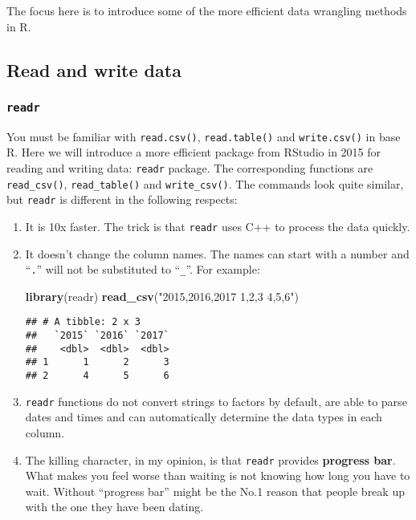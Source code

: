 \documentclass[
]{article}
\newenvironment{Shaded}{\begin{snugshade}}{\end{snugshade}}
\newcommand{\KeywordTok}[1]{\textcolor[rgb]{0.13,0.29,0.53}{\textbf{#1}}}
\newcommand{\NormalTok}[1]{#1}
\newcommand{\StringTok}[1]{\textcolor[rgb]{0.31,0.60,0.02}{#1}}
\begin{document}
The focus here is to introduce some of the more efficient data wrangling
methods in R.

\hypertarget{read-and-write-data}{%
\subsection{Read and write data}\label{read-and-write-data}}

\hypertarget{readr}{%
\subsubsection{\texorpdfstring{\texttt{readr}}{readr}}\label{readr}}

You must be familiar with \texttt{read.csv()}, \texttt{read.table()} and
\texttt{write.csv()} in base R. Here we will introduce a more efficient
package from RStudio in 2015 for reading and writing data:
\texttt{readr} package. The corresponding functions are
\texttt{read\_csv()}, \texttt{read\_table()} and \texttt{write\_csv()}.
The commands look quite similar, but \texttt{readr} is different in the
following respects:

\begin{enumerate}
\def\labelenumi{\arabic{enumi}.}
\item
  It is 10x faster. The trick is that \texttt{readr} uses C++ to process
  the data quickly.
\item
  It doesn't change the column names. The names can start with a number
  and ``\texttt{.}'' will not be substituted to ``\texttt{\_}''. For
  example:

\begin{Shaded}
\begin{Highlighting}[]
\KeywordTok{library}\NormalTok{(readr)}
\KeywordTok{read_csv}\NormalTok{(}\StringTok{"2015,2016,2017}
\StringTok{1,2,3}
\StringTok{4,5,6"}\NormalTok{)}
\end{Highlighting}
\end{Shaded}

\begin{verbatim}
## # A tibble: 2 x 3
##   `2015` `2016` `2017`
##    <dbl>  <dbl>  <dbl>
## 1      1      2      3
## 2      4      5      6
\end{verbatim}
\item
  \texttt{readr} functions do not convert strings to factors by default,
  are able to parse dates and times and can automatically determine the
  data types in each column.
\item
  The killing character, in my opinion, is that \texttt{readr} provides
  \textbf{progress bar}. What makes you feel worse than waiting is not
  knowing how long you have to wait. Without ``progress bar'' might be
  the No.1 reason that people break up with the one they have been
  dating.
\end{enumerate}
\end{document}
